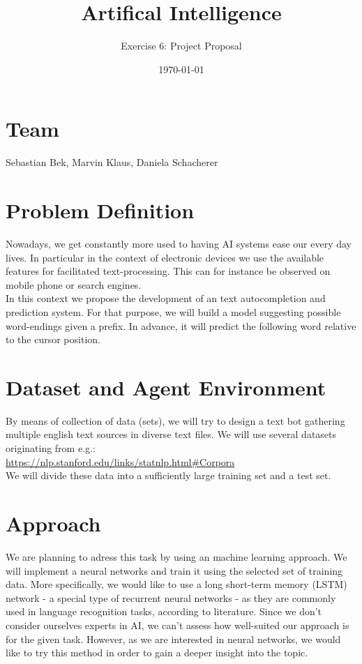 \documentclass[a4paper,11pt]{scrartcl}
\title{\vspace{-1cm}Artifical Intelligence}
\subtitle{Exercise 6: Project Proposal} \date{\today}
\begin{document}
\maketitle

\section*{Team}
Sebastian Bek, Marvin Klaus, Daniela Schacherer
\section*{Problem Definition}

Nowadays, we get constantly more used to having AI systems ease our every day lives. In particular in the context of electronic devices we use the available features for facilitated text-processing. This can for instance be observed on mobile phone or search engines. \\
In this context we propose the development of an text autocompletion and prediction system. For that purpose, we will build a model suggesting possible word-endings given a prefix. In advance, it will predict the following word relative to the cursor position.

\section*{Dataset and Agent Environment}

By means of collection of data (sets), we will try to design a text bot gathering multiple english text sources in diverse text files. We will use several datasets originating from e.g.:\\
\url{https://nlp.stanford.edu/links/statnlp.html#Corpora}\\
We will divide these data into a sufficiently large training set and a test set. 

\section*{Approach}

We are planning to adress this task by using an machine learning approach. We will implement a neural networks and train it using the selected set of training data. More specifically, we would like to use a long short-term memory (LSTM) network - a special type of recurrent neural networks - as they are commonly used in language recognition tasks, according to literature. 
Since we don't consider ourselves experts in AI, we can't assess how well-suited our approach is for the given task. However, as we are interested in neural networks, we would like to try this method in order to gain a deeper insight into the topic.\\
\end{document}
